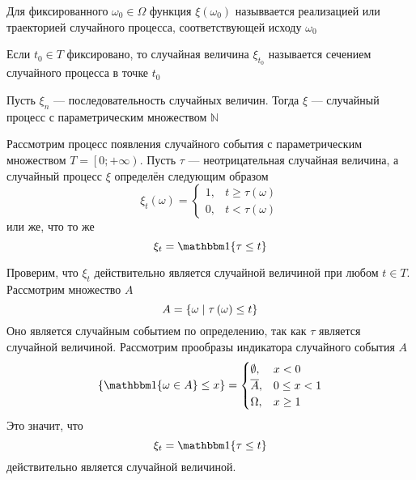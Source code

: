 \begin{definition}
  Для фиксированного $\omega_0 \in \Omega$ функция $\xi\left( \omega_0 \right)$
  назыввается реализацией или траекторией случайного процесса, соответствующей
  исходу $\omega_0$
\end{definition}

\begin{definition}
  Если $t_0 \in T$ фиксировано, то случайная величина $\xi_{t_0}$ называется
  сечением случайного процесса в точке $t_0$
\end{definition}

\begin{example}
  Пусть $\xi_n$ --- последовательность случайных величин.
  Тогда $\xi$ --- случайный процесс с параметрическим множеством $\mathbb{N}$
\end{example}

\begin{example}
  Рассмотрим процесс появления случайного события с параметрическим множеством
  $T = \left[ 0; +\infty \right)$.
  Пусть $\tau$ --- неотрицательная случайная величина, а случайный процесс $\xi$
  определён следующим образом
  \begin{equation*}
    \xi_t\left( \omega \right)
    = \begin{cases}
        1, &t \ge \tau\left( \omega \right) \\
        0, &t < \tau\left( \omega \right)
      \end{cases}
  \end{equation*}
  или же, что то же
  \begin{equation*}
    \xi_t = \Indicator{\tau \le t}
  \end{equation*}

  Проверим, что $\xi_t$ действительно является случайной величиной при любом
  $t \in T$.
  Рассмотрим множество $A$
  \begin{equation*}
    A = \left\{ \omega \;\middle|\; \tau\left( \omega \right) \le t \right\}
  \end{equation*}
  Оно является случайным событием по определению, так как $\tau$ является
  случайной величиной.
  Рассмотрим прообразы индикатора случайного события $A$
  \begin{equation*}
    \left\{ \Indicator{\omega \in A} \le x \right\}
    = \begin{cases}
      \emptyset, &x < 0 \\
      \stcomp{A}, &0 \le x < 1 \\
      \Omega, &x \ge 1
    \end{cases}
  \end{equation*}
  Это значит, что
  \begin{equation*}
    \xi_t = \Indicator{\tau \le t}
  \end{equation*}
  действительно является случайной величиной.
\end{example}
